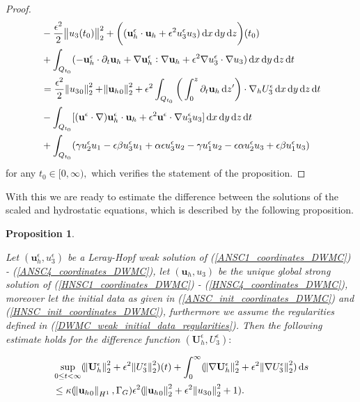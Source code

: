 \documentclass[12pt]{report}
\numberwithin{theorem}{chapter}
\numberwithin{corollary}{chapter}
\numberwithin{lemma}{chapter}
\numberwithin{remark}{chapter}
\numberwithin{definition}{chapter}
\newtheorem{prop}{Proposition}
\numberwithin{prop}{chapter}
\newcommand*\diff{\mathop{}\!\mathrm{d}}
\begin{document}
\begin{proof}
\begin{equation}
  \begin{split}
    & - \frac{\epsilon^2}{2} \norm{u_3(t_0)}_2^2 + \bigg ( (\mathbf{u}_h^\epsilon \cdot \mathbf{u}_h + \epsilon^2 u_3^\epsilon u_3) \diff x \diff y \diff z  \bigg ) (t_0) \\
    & + \int_{Q_{t_0}} (-\mathbf{u}_h^\epsilon \cdot \partial_t \mathbf{u}_h + \nabla \mathbf{u}_h^\epsilon : \nabla \mathbf{u}_h + \epsilon^2 \nabla u_3^\epsilon \cdot \nabla u_3) \diff x \diff y \diff z \diff t \\
    & = \frac{\epsilon^2}{2} \norm{{u_3}_0}_2^2 + \norm{{\mathbf{u}_h}_0}_2^2 + \epsilon^2 \int_{Q_{t_0}} \bigg ( \int_0^z \partial_t \mathbf{u}_h \diff z' \bigg ) \cdot \nabla_h U_3^\epsilon \diff x \diff y \diff z \diff t \\
    & - \int_{Q_{t_0}} [(\mathbf{u}^\epsilon \cdot \nabla) \mathbf{u}_h^\epsilon \cdot \mathbf{u}_h + \epsilon^2 \mathbf{u}^\epsilon \cdot \nabla u_3^\epsilon u_3] \diff x \diff y \diff z \diff t \\
    & + \int_{Q_{t_0}}  ( \gamma u_2^\epsilon u_1 - \epsilon \beta u_3^\epsilon u_1 + \alpha \epsilon u_3^\epsilon u_2 - \gamma u_1^\epsilon u_2 - \epsilon \alpha u_2^\epsilon u_3 + \epsilon \beta u_1^\epsilon u_3)
  \end{split}
\end{equation}
%
for any $t_0 \in [0, \infty),$ which verifies the statement of the proposition.

\end{proof}

With this we are ready to estimate the difference between the solutions of the scaled and hydrostatic equations, which is described by the following proposition.

\begin{prop} \label{convrateweakframework}

Let $(\mathbf{u}_h^\epsilon, u_3^\epsilon)$ be a Leray-Hopf weak solution of (\ref{ANSC1_coordinates_DWMC}) - (\ref{ANSC4_coordinates_DWMC}), let $(\mathbf{u}_h,u_3)$ be the unique global strong solution of (\ref{HNSC1_coordinates_DWMC}) - (\ref{HNSC4_coordinates_DWMC}), moreover let the initial data as given in (\ref{ANSC_init_coordinates_DWMC}) and (\ref{HNSC_init_coordinates_DWMC}), furthermore we assume the regularities defined in (\ref{DWMC_weak_initial_data_regularities}). Then the following estimate holds for the difference function $(\mathbf{U}_h^\epsilon, U_3^\epsilon):$

\begin{equation}\label{horizontal_velocities_convergence}
  \begin{split}
    & \sup_{0 \leq t < \infty} ( \norm{\mathbf{U}_h^\epsilon}_2^2 + \epsilon^2 \norm{U_3^\epsilon}_2^2)(t) + \int_0 ^ \infty ( \norm{\nabla \mathbf{U}_h^\epsilon}_2^2 + \epsilon^2 \norm{\nabla U_3^\epsilon}_2^2)\diff s \\
    & \leq \kappa (\norm{{\mathbf{u}_h}_0}_{H^1}, \Gamma_G) \epsilon^2 (\norm{{\mathbf{u}_h}_0}_2^2 + \epsilon^2 \norm{{u_3}_0}_2^2 + 1).
  \end{split}
\end{equation}

\end{prop}
\end{document}
